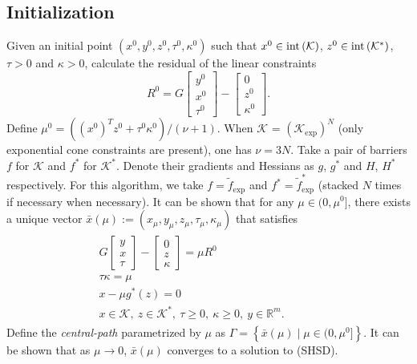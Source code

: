 \documentclass[11pt]{article}
\theoremstyle{definition}
\theoremstyle{plain}
\def\interior{\protect{\textnormal{int}}}
\begin{document}
\subsection{Initialization} Given an initial point $(x^0, y^0, z^0, \tau^0, \kappa^0)$ such that $x^0 \in \interior\left(\mathcal{K}\right)$, $z^0 \in \interior\left(\mathcal{K}^*\right)$, $\tau>0$ and $\kappa>0$, calculate the residual of the linear constraints
\[R^0 =  G
\begin{bmatrix}
y^0 \\ x^0 \\ \tau^0
\end{bmatrix} - 
\begin{bmatrix}
0 \\ z^0 \\ \kappa^0
\end{bmatrix}.\]
Define $\mu^0 = \left((x^0)^T z^0 + \tau^0\kappa^0\right)/(\nu+1)$.  When $\mathcal{K}$ = $\left(\mathcal{K}_{\exp}\right)^N$ (only exponential cone constraints are present), one has $\nu = 3N$. Take a pair of barriers $f$ for $\mathcal{K}$ and $f^*$ for $\mathcal{K}^*$. Denote their gradients and Hessians as $g$, $g^*$ and $H$, $H^*$ respectively. For this algorithm, we take $f = \tilde{f}_{\exp}$ and $f^* = \tilde{f}_{\exp}^*$ (stacked $N$ times if necessary when necessary). It can be shown that for any $\mu \in (0,\mu^0]$, there exists a unique vector $\bar{x}(\mu) := (x_\mu, y_\mu, z_\mu, \tau_\mu, \kappa_\mu)$ that satisfies
\begin{align*}
\begin{split}
G \begin{bmatrix}
y \\ x \\ \tau
\end{bmatrix} - 
\begin{bmatrix}
0 \\ z \\ \kappa 
\end{bmatrix} = 
\mu R^0 \\[1ex]
 \tau \kappa = \mu \\[1ex]
 x - \mu g^*(z) = 0 \\[1ex]
x \in \mathcal{K},\ z \in \mathcal{K}^*,\ \tau \geq 0,\ \kappa\geq 0,\ y \in \mathbb{R}^m.
\end{split} \quad \quad \quad
\end{align*}
Define the \textit{central-path} parametrized by $\mu$ as $\Gamma = \left\{ \bar{x}(\mu) \mid \mu \in (0,\mu^0] \right\}$. It can be shown that as $\mu \rightarrow 0$, $\bar{x}(\mu)$ converges to a solution to (SHSD).
\end{document}
